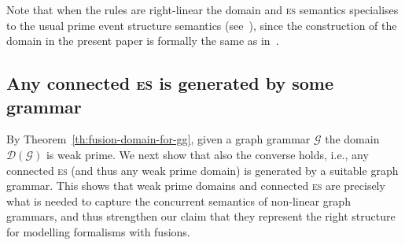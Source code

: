 \documentclass[conference]{IEEEtran}
\newcommand{\esabbr}{\textsc{es}}
\newcommand{\zdom}[0]{\ensuremath{\mathcal{D}}}
\newcommand{\dom}[1]{\ensuremath{\zdom({#1})}}
\begin{document}







Note that when the rules are right-linear the domain and {\esabbr} semantics
specialises to the usual prime event structure semantics
(see~\cite{Handbook,Bal:PhD,Sch:RRSG}), since the construction of the
domain in the present paper is formally the same as
in~\cite{Handbook}.

\subsection{Any connected {\esabbr} is generated by some grammar}
\label{ss:es-graph}

By Theorem~\ref{th:fusion-domain-for-gg}, given a graph grammar
$\mathcal{G}$ the domain $\dom{\mathcal{G}}$ is weak prime.
We next show that also the converse holds, i.e., any connected
{\esabbr} (and thus any weak prime domain) is generated by a suitable graph
grammar.
%
This shows that weak prime domains and connected {\esabbr} are
precisely what is needed to capture the concurrent semantics of
non-linear graph grammars, and thus strengthen our claim that they
represent the right structure for modelling formalisms with fusions.
\end{document}

